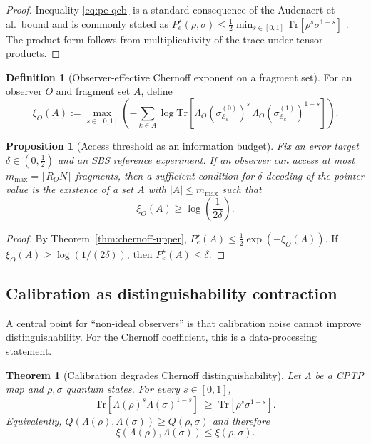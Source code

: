 \documentclass[11pt]{article}
\newcommand{\cE}{\mathcal{E}}
\newcommand{\1}{\mathbf{1}}
\newcommand{\QCBcoef}{Q}
\newcommand{\QCBdist}{\xi}
\theoremstyle{definition}
\newtheorem{definition}{Definition}
\theoremstyle{plain}
\newtheorem{theorem}{Theorem}
\newtheorem{proposition}{Proposition}
\begin{document}
\begin{proof}
Inequality \eqref{eq:pe-qcb} is a standard consequence of the Audenaert et al.\ bound and is commonly stated as $P_e^\star(\rho,\sigma)\le \tfrac12 \min_{s\in[0,1]}\mathrm{Tr}[\rho^s\sigma^{1-s}]$ \citep{Audenaert2007}.
The product form follows from multiplicativity of the trace under tensor products.
\end{proof}

\begin{definition}[Observer-effective Chernoff exponent on a fragment set]
\label{def:xiA}
For an observer $O$ and fragment set $A$, define
\begin{equation}
\QCBdist_O(A):=
\max_{s\in[0,1]}\left(-\sum_{k\in A}\log \mathrm{Tr}\!\left[\Lambda_O(\sigma^{(0)}_{\cE_k})^s\,\Lambda_O(\sigma^{(1)}_{\cE_k})^{1-s}\right]\right).
\label{eq:xiA}
\end{equation}
\end{definition}

\begin{proposition}[Access threshold as an information budget]
\label{prop:access-threshold}
Fix an error target $\delta\in(0,\tfrac12)$ and an SBS reference experiment.
If an observer can access at most $m_{\max}=\lfloor R_O N\rfloor$ fragments, then a sufficient condition for $\delta$-decoding of the pointer value is the existence of a set $A$ with $|A|\le m_{\max}$ such that
\[
\QCBdist_O(A)\ge \log\!\left(\frac{1}{2\delta}\right).
\]
\end{proposition}

\begin{proof}
By Theorem~\ref{thm:chernoff-upper},
$P_e^\star(A)\le \tfrac12 \exp(-\QCBdist_O(A))$.
If $\QCBdist_O(A)\ge \log(1/(2\delta))$, then $P_e^\star(A)\le \delta$.
\end{proof}

\subsection{Calibration as distinguishability contraction}

A central point for ``non-ideal observers'' is that calibration noise cannot improve distinguishability.
For the Chernoff coefficient, this is a data-processing statement.

\begin{theorem}[Calibration degrades Chernoff distinguishability]
\label{thm:chernoff-dpi}
Let $\Lambda$ be a CPTP map and $\rho,\sigma$ quantum states.
For every $s\in[0,1]$,
\[
\mathrm{Tr}\!\left[\Lambda(\rho)^s\Lambda(\sigma)^{1-s}\right]
\;\ge\;
\mathrm{Tr}\!\left[\rho^s\sigma^{1-s}\right].
\]
Equivalently, $\QCBcoef(\Lambda(\rho),\Lambda(\sigma))\ge \QCBcoef(\rho,\sigma)$ and therefore
\[
\QCBdist(\Lambda(\rho),\Lambda(\sigma))\le \QCBdist(\rho,\sigma).
\]
\end{theorem}
\end{document}
